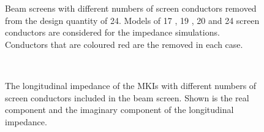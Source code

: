 \begin{figure}
{\label{fig:24-cond-alt}
}
\caption{Beam screens with different numbers of screen conductors removed from the design quantity of 24. Models of 17 , 19 , 20  and 24  screen conductors are considered for the impedance simulations. Conductors that are coloured red are the removed in each case.}
\label{fig:mki-take-away-cond-alt}
\end{figure}

\begin{figure}
\begin{center}
\\
\end{center}
\caption{The longitudinal impedance of the MKIs with different numbers of screen conductors included in the beam screen. Shown is the real component  and the imaginary component  of the longitudinal impedance.}
\label{fig:remove-cond-impedance}
\end{figure}

